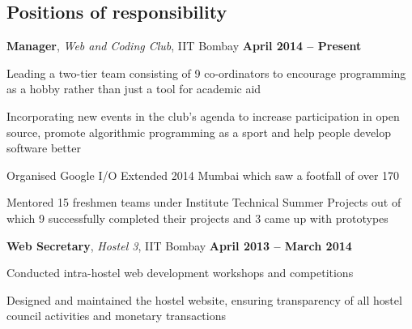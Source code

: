 \documentclass[margin,11pt]{resume}
\begin{document}
\begin{resume}
\section{\mysidestyle Positions of responsibility}
\textbf{Manager}, \textsl{Web and Coding Club}, IIT Bombay \hfill \textbf{April 2014 -- Present}\\
\begin{list2}
\vspace{-4mm}
\item Leading a two-tier team consisting of 9 co-ordinators to encourage programming as a hobby rather than just a tool for academic aid
\item Incorporating new events in the club's agenda to increase participation in open source, promote algorithmic programming as a sport and help people develop software better
\item Organised Google I/O Extended 2014 Mumbai which saw a footfall of over 170
\item Mentored 15 freshmen teams under Institute Technical Summer Projects out of which 9 successfully completed their projects and 3 came up with prototypes
\end{list2}
\vspace{-2.5mm}
\textbf{Web Secretary}, \textsl{Hostel 3}, IIT Bombay \hfill \textbf{April 2013 -- March 2014}\\
\begin{list2}
\vspace{-4mm}
\item Conducted intra-hostel web development workshops and competitions
\item Designed and maintained the hostel website, ensuring transparency of all hostel council activities and monetary transactions 
\end{list2}



\end{resume}
\end{document}
